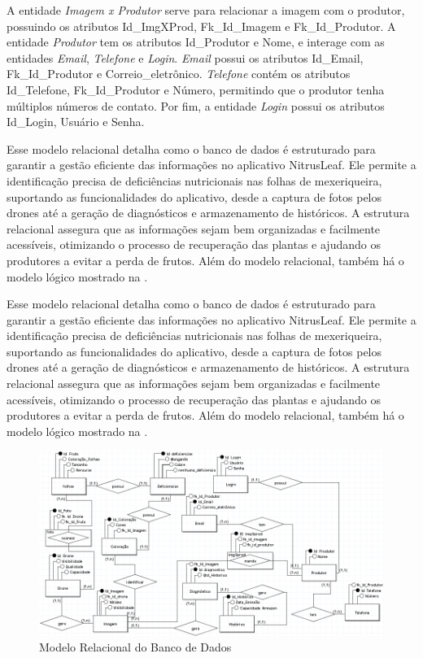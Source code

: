 A entidade \textit{Imagem x Produtor} serve para relacionar a imagem com o produtor, possuindo os atributos Id\_ImgXProd, Fk\_Id\_Imagem e Fk\_Id\_Produtor. A entidade \textit{Produtor} tem os atributos Id\_Produtor e Nome, e interage com as entidades \textit{Email}, \textit{Telefone} e \textit{Login}. \textit{Email} possui os atributos Id\_Email, Fk\_Id\_Produtor e Correio\_eletrônico. \textit{Telefone} contém os atributos Id\_Telefone, Fk\_Id\_Produtor e Número, permitindo que o produtor tenha múltiplos números de contato. Por fim, a entidade \textit{Login} possui os atributos Id\_Login, Usuário e Senha.

Esse modelo relacional detalha como o banco de dados é estruturado para garantir a gestão eficiente das informações no aplicativo NitrusLeaf. Ele permite a identificação precisa de deficiências nutricionais nas folhas de mexeriqueira, suportando as funcionalidades do aplicativo, desde a captura de fotos pelos drones até a geração de diagnósticos e armazenamento de históricos. A estrutura relacional assegura que as informações sejam bem organizadas e facilmente acessíveis, otimizando o processo de recuperação das plantas e ajudando os produtores a evitar a perda de frutos. Além do modelo relacional, também há o modelo lógico mostrado na .


Esse modelo relacional detalha como o banco de dados é estruturado para garantir a gestão eficiente das informações no aplicativo NitrusLeaf. Ele permite a identificação precisa de deficiências nutricionais nas folhas de mexeriqueira, suportando as funcionalidades do aplicativo, desde a captura de fotos pelos drones até a geração de diagnósticos e armazenamento de históricos. A estrutura relacional assegura que as informações sejam bem organizadas e facilmente acessíveis, otimizando o processo de recuperação das plantas e ajudando os produtores a evitar a perda de frutos. Além do modelo relacional, também há o modelo lógico mostrado na .

\begin{figure}[H]
\centering
\caption{Modelo Relacional do Banco de Dados}%
\label{fig:mbdrelacional}
\includegraphics[width=0.8\linewidth]{Illustrations/mbdrelacional.png}
\end{figure}

